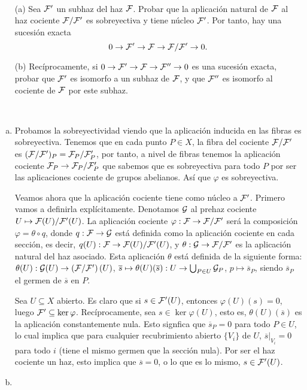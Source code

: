 \documentclass[twoside]{article}
\begin{document}

\begin{ejercicio}{1.6}\
\begin{enumerate}
\item[(a)]
Sea $\mathcal{F}'$ un subhaz del haz $\mathcal{F}$. Probar que la aplicación natural de $\mathcal{F}$ al haz cociente $\mathcal{F}/\mathcal{F}'$ es sobreyectiva y tiene núcleo $\mathcal{F}'$. Por tanto, hay una sucesión exacta 
\[
0\to \mathcal{F}'\to\mathcal{F}\to \mathcal{F}/\mathcal{F}'\to 0.
\]

\item[(b)] Recíprocamente, si $0\to \mathcal{F}'\to\mathcal{F}\to \mathcal{F}''\to 0$ es una sucesión exacta, probar que $\mathcal{F}'$ es isomorfo a un subhaz de $\mathcal{F}$, y que $\mathcal{F}''$ es isomorfo al cociente de $\mathcal{F}$ por este subhaz.
\end{enumerate}
\end{ejercicio}
\begin{solucion}\
\begin{enumerate}[(a)]
\item Probamos la sobreyectividad viendo que la aplicación inducida en las fibras es sobreyectiva. Tenemos que en cada punto $P\in X$, la fibra del cociente $\mathcal{F}/\mathcal{F}'$ es $(\mathcal{F}/\mathcal{F}')_P=\mathcal{F}_P/\mathcal{F}'_P$, por tanto, a nivel de fibras tenemos la aplicación cociente $\mathcal{F}_P\to \mathcal{F}_P/\mathcal{F}'_P$ que sabemos que es sobreyectiva para todo $P$ por ser las aplicaciones cociente de grupos abelianos. Así que $\varphi$ es sobreyectiva.

Veamos ahora que la aplicación cociente tiene como núcleo a $\mathcal{F}'$. Primero vamos a definirla explícitamente. Denotamos $\mathcal{G}$ al prehaz cociente $U\mapsto \mathcal{F}(U)/\mathcal{F}'(U)$. La aplicación cociente $\varphi:\mathcal{F}\to\mathcal{F}/\mathcal{F}'$ será la composición $\varphi=\theta\circ q$, donde $q:\mathcal{F}\to \mathcal{G}$ está definida como la aplicación cociente en cada sección, es decir, $q(U): \mathcal{F}\to \mathcal{F}(U)/\mathcal{F}'(U)$, y $\theta:\mathcal{G}\to\mathcal{F}/\mathcal{F}'$ es la aplicación natural del haz asociado. Esta aplicación $\theta$ está definida de la siguiente forma: $\theta(U):\mathcal{G}(U)\to\left(\mathcal{F}/\mathcal{F}'\right)(U)$, $\overline{s}\mapsto\theta(U)(\overline{s}):U\to\bigcup_{P\in U} \mathcal{G}_P$, $p\mapsto\overline{s}_P$, siendo $\overline{s}_P$ el germen de $\overline{s}$ en $P$.

Sea $U\subseteq X$ abierto. Es claro que si $s\in\mathcal{F}'(U)$, entonces $\varphi(U)(s)=0$, luego $\mathcal{F}'\subseteq\ker\varphi$. Recíprocamente, sea $s\in \ker\varphi(U)$, esto es, $\theta(U)(\overline{s})$ es la aplicación constantemente nula. Esto signfica que $\overline{s}_P=0$ para todo $P\in U$, lo cual implica que para cualquier recubrimiento abierto $\{V_i\}$ de $U$, $\overline{s}|_{V_i}=0$ para todo $i$ (tiene el mismo germen que la sección nula). Por ser el haz cociente un haz, esto implica que $\overline{s}=0$, o lo que es lo mismo, $s\in \mathcal{F}'(U)$. 


\item
\end{enumerate}
\end{solucion}
\end{document}
